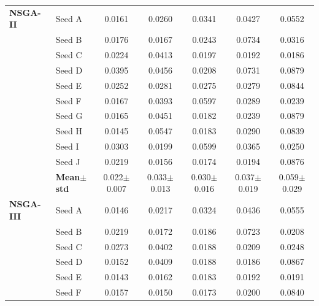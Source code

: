 \begin{table}[H]
{\begin{tabular}{@{}llccccc@{}}
\midrule
 \textbf{NSGA-II} & Seed A & {\small 0.0161} & {\small 0.0260} & {\small 0.0341} & {\small 0.0427} & {\small 0.0552} \\
  & Seed B & {\small 0.0176} & {\small 0.0167} & {\small 0.0243} & {\small 0.0734} & {\small 0.0316} \\
  & Seed C & {\small 0.0224} & {\small 0.0413} & {\small 0.0197} & {\small 0.0192} & {\small 0.0186} \\
  & Seed D & {\small 0.0395} & {\small 0.0456} & {\small 0.0208} & {\small 0.0731} & {\small 0.0879} \\
  & Seed E & {\small 0.0252} & {\small 0.0281} & {\small 0.0275} & {\small 0.0279} & {\small 0.0844} \\
  & Seed F & {\small 0.0167} & {\small 0.0393} & {\small 0.0597} & {\small 0.0289} & {\small 0.0239} \\
  & Seed G & {\small 0.0165} & {\small 0.0451} & {\small 0.0182} & {\small 0.0239} & {\small 0.0879} \\
  & Seed H & {\small 0.0145} & {\small 0.0547} & {\small 0.0183} & {\small 0.0290} & {\small 0.0839} \\
  & Seed I & {\small 0.0303} & {\small 0.0199} & {\small 0.0599} & {\small 0.0365} & {\small 0.0250} \\
  & Seed J & {\small 0.0219} & {\small 0.0156} & {\small 0.0174} & {\small 0.0194} & {\small 0.0876} \\
 & \textbf{Mean$\pm$std} & \cellcolor{ForestGreen!25}0.022$\pm$0.007 & \cellcolor{ForestGreen!25}0.033$\pm$0.013 & \cellcolor{ForestGreen!25}0.030$\pm$0.016 & \cellcolor{ForestGreen!25}0.037$\pm$0.019 & \cellcolor{ForestGreen!25}0.059$\pm$0.029 \\
\midrule
 \textbf{NSGA-III} & Seed A & {\small 0.0146} & {\small 0.0217} & {\small 0.0324} & {\small 0.0436} & {\small 0.0555} \\
  & Seed B & {\small 0.0219} & {\small 0.0172} & {\small 0.0186} & {\small 0.0723} & {\small 0.0208} \\
  & Seed C & {\small 0.0273} & {\small 0.0402} & {\small 0.0188} & {\small 0.0209} & {\small 0.0248} \\
  & Seed D & {\small 0.0152} & {\small 0.0409} & {\small 0.0188} & {\small 0.0186} & {\small 0.0867} \\
  & Seed E & {\small 0.0143} & {\small 0.0162} & {\small 0.0183} & {\small 0.0192} & {\small 0.0191} \\
  & Seed F & {\small 0.0157} & {\small 0.0150} & {\small 0.0173} & {\small 0.0200} & {\small 0.0840} \\

\end{tabular}}
\end{table}
